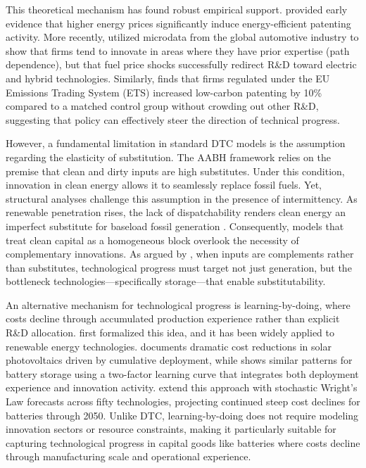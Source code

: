 \documentclass[12pt, a4paper]{article}
\begin{document}
This theoretical mechanism has found robust empirical support. \citet{popp2002} provided early evidence that higher energy prices significantly induce energy-efficient patenting activity. More recently, \citet{aghion2016} utilized microdata from the global automotive industry to show that firms tend to innovate in areas where they have prior expertise (path dependence), but that fuel price shocks successfully redirect R\&D toward electric and hybrid technologies. Similarly, \citet{calel2016} finds that firms regulated under the EU Emissions Trading System (ETS) increased low-carbon patenting by 10\% compared to a matched control group without crowding out other R\&D, suggesting that policy can effectively steer the direction of technical progress.

However, a fundamental limitation in standard DTC models is the assumption regarding the elasticity of substitution. The AABH framework relies on the premise that clean and dirty inputs are high substitutes. Under this condition, innovation in clean energy allows it to seamlessly replace fossil fuels. Yet, structural analyses challenge this assumption in the presence of intermittency. As renewable penetration rises, the lack of dispatchability renders clean energy an imperfect substitute for baseload fossil generation \citep{hirth2013, joskow2011}. Consequently, models that treat clean capital as a homogeneous block overlook the necessity of complementary innovations. As argued by \citet{hart2019}, when inputs are complements rather than substitutes, technological progress must target not just generation, but the bottleneck technologies---specifically storage---that enable substitutability.

An alternative mechanism for technological progress is learning-by-doing, where costs decline through accumulated production experience rather than explicit R\&D allocation. \citet{arrow1962} first formalized this idea, and it has been widely applied to renewable energy technologies. \citet{nemet2006} documents dramatic cost reductions in solar photovoltaics driven by cumulative deployment, while \citet{kittner2017} shows similar patterns for battery storage using a two-factor learning curve that integrates both deployment experience and innovation activity. \citet{way2022} extend this approach with stochastic Wright's Law forecasts across fifty technologies, projecting continued steep cost declines for batteries through 2050. Unlike DTC, learning-by-doing does not require modeling innovation sectors or resource constraints, making it particularly suitable for capturing technological progress in capital goods like batteries where costs decline through manufacturing scale and operational experience.
\end{document}
